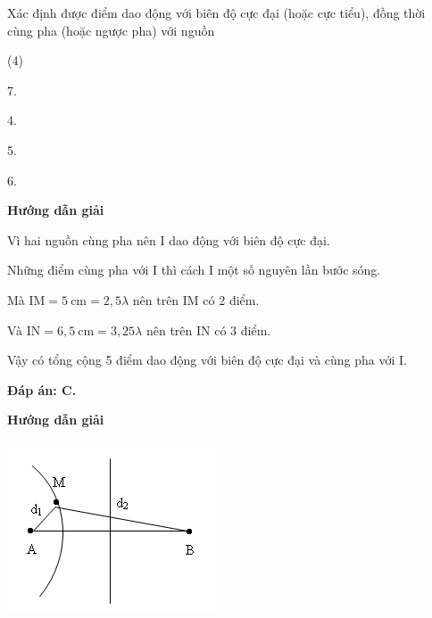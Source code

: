 \begin{dang}{Xác định được điểm dao động với biên độ cực đại (hoặc cực tiểu), đồng thời\\ cùng pha (hoặc ngược pha) với nguồn}
{		\begin{mcq}(4)
			\item 7.
			\item 4.
			\item 5.
			\item 6.
		\end{mcq}
	}
	{\begin{center}
			\textbf{Hướng dẫn giải}
		\end{center}
		
		Vì hai nguồn cùng pha nên I dao động với biên độ cực đại.
		
		Những điểm cùng pha với I thì cách I một số nguyên lần bước sóng.
		
		Mà $\text{IM} = 5\ \text{cm} = 2,5 \lambda$ nên trên IM có 2 điểm. 
		
		Và $\text{IN} = 6,5\ \text{cm} = 3,25 \lambda$ nên trên IN có 3 điểm.
		
		Vậy có tổng cộng 5 điểm dao động với biên độ cực đại và cùng pha với I.
		
		\textbf{Đáp án: C.}
	}
	{
		\begin{center}
			\textbf{Hướng dẫn giải}
			
			\vspace*{1em}
			\includegraphics[scale=0.8]{../figs/VN12-PH-11-A-007-2-V2-1.png}
		\end{center}
		
}
\end{dang}
